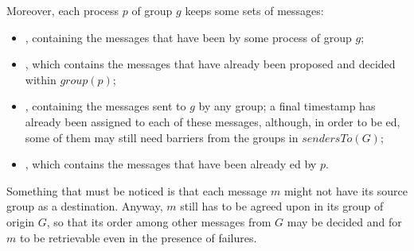 \documentclass[times, 10pt]{article}
\begin{document}
Moreover, each process $p$ of group $g$ keeps some sets of messages:
\begin{itemize}
  \item \textit{\localmsgs}, containing the %
  messages that have been \amcast{} by some process of group $g$;
  \item \textit{\decided}, which contains the messages that have already been proposed and decided within $group(p)$;
  \item \textit{\stamped}, containing the messages sent to $g$ by any group; a final timestamp has already been assigned to each of these messages, although, in order to be \amdel{}ed, some of them may still need barriers from the groups in $sendersTo(G)$;
  \item \textit{\delivered}, which contains the messages that have been already \amdel{}ed by $p$.
\end{itemize} 


Something that must be noticed is that each message $m$ might not have its source group as a destination. Anyway, $m$ still has to be agreed upon in its group of origin $G$, so that its order among other messages from $G$ may be decided and for %
$m$ to be retrievable even in the presence of failures.%
\end{document}
